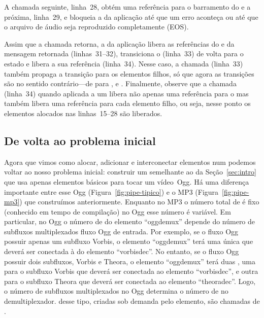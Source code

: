 \documentclass{SBCbookchapter}
\begin{document}
A chamada seguinte, linha~28, obtém uma referência para o barramento do
 e a próxima, linha~29, e bloqueia a  da aplicação
até que um erro aconteça ou até que o arquivo de áudio seja reproduzido
completamente (EOS).

Assim que a chamada  retorna, a  da
aplicação libera as referências do  e da mensagem retornada
(linhas~31--32), transiciona o  (linha~33) de volta para o
estado  e libera a sua referência (linha~34).  Nesse caso, a
chamada  (linha~33) também propaga a transição para
os elementos filhos, só que agora as transições são no sentido
contrário---de  para ,  e .
Finalmente, observe que a chamada  (linha~34) quando
aplicada a um  libera não apenas uma referência para o  mas
também libera uma referência para cada elemento filho, ou seja, nesse ponto
os elementos alocados nas linhas~15--28 são liberados.


\subsection*{De volta ao problema inicial}

Agora que vimos como alocar, adicionar e interconectar elementos num
 podemos voltar ao nosso problema inicial: construir um
 semelhante ao da Seção~\ref{sec:intro} que usa apenas
elementos básicos para tocar um vídeo~Ogg.  Há uma diferença importante
entre esse  Ogg (Figura~\ref{fig:pipe-tipico}) e o
 MP3 (Figura~\ref{fig:pipe-mp3}) que construímos anteriormente.
Enquanto no  MP3 o número total de  é fixo (conhecido
em tempo de compilação) no  Ogg esse número é variável.  Em
particular, no  Ogg o número de  do elemento
``oggdemux'' depende do número de subfluxos multiplexados fluxo Ogg de
entrada.  Por exemplo, se o fluxo Ogg possuir apenas um subfluxo Vorbis, o
elemento ``oggdemux'' terá uma única  que deverá ser conectada
à  do elemento ``vorbisdec''.  No entanto, se o fluxo Ogg
possuir dois subfluxos, Vorbis e Theora, o elemento ``oggdemux'' terá duas
, uma para o subfluxo Vorbis que deverá ser conectada ao
elemento ``vorbisdec'', e outra para o subfluxo Theora que deverá ser
conectada ao elemento ``theoradec''.  Logo, o número de subfluxos
multiplexados no Ogg determina o número de  no
demultiplexador.   desse tipo, criadas sob demanda pelo elemento,
são chamadas de .
\end{document}
